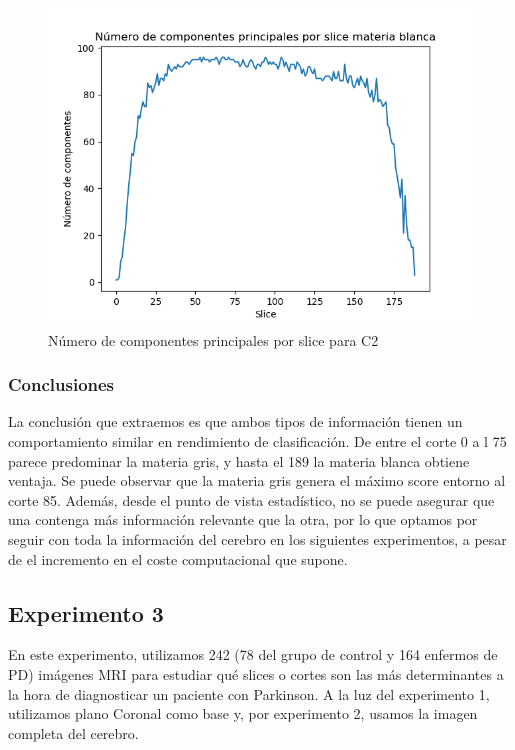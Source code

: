 \begin{figure}[H] %
	\centering
	\includegraphics[scale=0.7]{pcc2.png}  %
	\caption{Número de componentes principales por slice para C2} 
	\label{fig:pcc2}
\end{figure}

\subsubsection{Conclusiones}

La conclusión que extraemos es que ambos tipos de información tienen un comportamiento similar en rendimiento de clasificación. De entre el corte 0 a l 75 parece predominar la materia gris, y hasta el 189 la materia blanca obtiene ventaja. Se puede observar que la materia gris genera el máximo score entorno al corte 85. Además, desde el punto de vista estadístico, no se puede asegurar que una contenga más información relevante que la otra, por lo que optamos por seguir con toda la información del cerebro en los siguientes experimentos, a pesar de el incremento en el coste computacional que supone. 
\newpage
\subsection{Experimento 3}

En este experimento, utilizamos 242 (78 del grupo de control y 164 enfermos de PD) imágenes MRI para estudiar qué slices o cortes son las más determinantes a la hora de diagnosticar un paciente con Parkinson. A la luz del experimento 1, utilizamos plano Coronal como base y, por experimento 2, usamos la imagen completa del cerebro.

